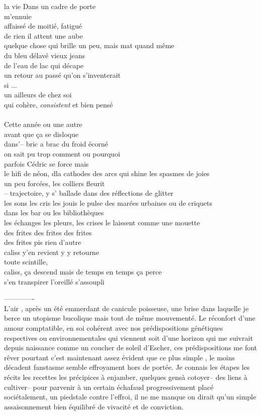 \documentclass{article}
\begin{document}
\begin{paracol}{2}
la vie
Dans un cadre de porte\\
m'ennuie\\
affaissé de moitié, fatigué\\
de rien il attent une aube\\
quelque chose qui brille un peu, mais mat quand même\\
du bleu délavé vieux jeans\\
de l'eau de lac qui décape\\
un retour au passé qu'on s'inventerait\\
si ... \\
un ailleurs de chez soi \\
qui cohère, \textit{consistent} et bien pensé\\
\\
\switchcolumn
Cette année ou une autre\\
avant que ça se disloque\\
dans'--  bric a brac du froid écorné \\
on sait pu trop comment ou pourquoi\\
parfois Cédric se force mais\\
le hifi de néon, dla cathodes des arcs
qui shine les spasmes de joies\\
un peu forcées, les colliers fleurit\\
-- trajectoire, y s' ballade dans des réflections de glitter\\
les sons les cris les jouis le pulse
des marées urbaines ou de criquets\\
dans les bar ou les bibliothèques\\
les échanges les pleurs, les crises
le laissent comme une mouette\\
des frites des frites des frites\\
des frites pis rien d'autre\\
caliss y'en revient y y retourne \\
toute scintille, \\
caliss, ça descend mais
de temps en temps ça perce\\
s'en transpirer l'oreillé s'assoupli\\

\end{paracol}
\clearpage
-------------\\
L'air , après un été emmerdant de canicule poisseuse,
une brise dans laquelle je berce un utopisme
bucolique mais tout de même mouvementé.
Le réconfort d'une amour comptatible,
en soi cohérent avec nos prédispositions
génétiques respectives ou environnementales qui viennent soit d'une horizon qui
me suivrait depuis naissance comme un coucher de soleil d'Escher, ces
prédispositions me font rêver pourtant c'est maintenant assez évident que ce
plus simple , le moins décadent fanstasme semble effroyament hors de portée. Je
connais les étapes les récits les recettes les précipices à enjamber, quelques
gensà cotoyer-- des liens à cultiver-- pour parvenir à un certain échafaud
progressivement placé sociétalement, un piedstale contre l'effroi, il ne me
manque on dirait qu'un simple assaisonnement bien équilibré de vivacité et de
conviction.
\end{document}
